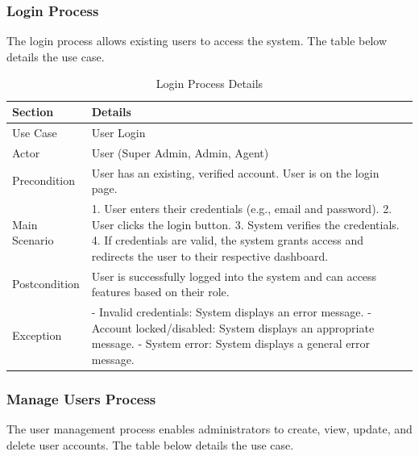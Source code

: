 \subsubsection{Login Process}
The login process allows existing users to access the system. The table below details the use case.
\newpage
\begin{table}[htbp]
    \centering
    \begin{tabular}{|l|p{}|}
        \hline
        \textbf{Section} & \textbf{Details} \\
        \hline
        Use Case & User Login \\
        \hline
        Actor & User (Super Admin, Admin, Agent) \\
        \hline
        Precondition & User has an existing, verified account. User is on the login page. \\
        \hline
        Main Scenario & 
        1. User enters their credentials (e.g., email and password).
        2. User clicks the login button.
        3. System verifies the credentials.
        4. If credentials are valid, the system grants access and redirects the user to their respective dashboard. \\
        \hline
        Postcondition & User is successfully logged into the system and can access features based on their role. \\
        \hline
        Exception & 
        - Invalid credentials: System displays an error message.
        - Account locked/disabled: System displays an appropriate message.
        - System error: System displays a general error message. \\
        \hline
    \end{tabular}
    \caption{Login Process Details}
    \label{tab:login_process}
\end{table}

\subsubsection{Manage Users Process}
The user management process enables administrators to create, view, update, and delete user accounts. The table below details the use case.


